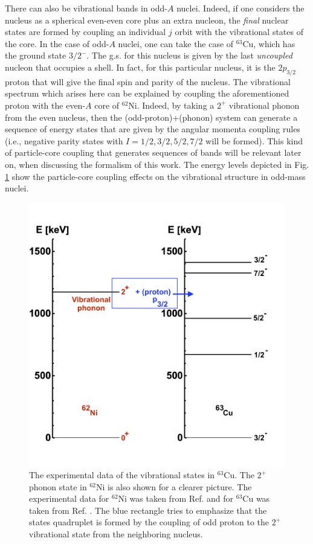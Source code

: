 There can also be vibrational bands in odd-$A$ nuclei. Indeed, if one considers the nucleus as a spherical even-even core plus an extra nucleon, the \emph{final} nuclear states are formed by coupling an individual $j$ orbit with the vibrational states of the core.
In the case of odd-$A$ nuclei, one can take the case of $^{63}$Cu, which has the ground state $3/2^{-}$. The g.s. for this nucleus is given by the last \emph{uncoupled} nucleon that occupies a shell. In fact, for this particular nucleus, it is the $2p_{3/2}$ proton that will give the final spin and parity of the nucleus. The vibrational spectrum which arises here can be explained by coupling the aforementioned proton with the even-$A$ core of $^{62}$Ni. Indeed, by taking a $2^+$ vibrational phonon from the even nucleus, then the (odd-proton)+(phonon) system can generate a sequence of energy states that are given by the angular momenta coupling rules (i.e., negative parity states with $I=1/2,3/2,5/2,7/2$ will be formed).
This kind of particle-core coupling that generates sequences of bands will be relevant later on, when discussing the formalism of this work.
The energy levels depicted in Fig. \ref{energy-levels-63Cu-virbational-band} show the particle-core coupling effects on the vibrational structure in odd-mass nuclei.

\begin{figure}
    \centering
    \includegraphics[scale=0.155]{Chapters/Figures/63Cu_vib_experimental.png}
    \caption{The experimental data of the vibrational states in $^{63}$Cu. The $2^+$ phonon state in $^{62}$Ni is also shown for a clearer picture. The experimental data for $^{62}$Ni was taken from Ref. \cite{nichols2012nuclear} and for $^{63}$Cu was taken from Ref. \cite{erjun2001nuclear}. The blue rectangle tries to emphasize that the states quadruplet is formed by the coupling of odd proton to the $2^+$ vibrational state from the neighboring nucleus.}
    \label{energy-levels-63Cu-virbational-band}
\end{figure}

